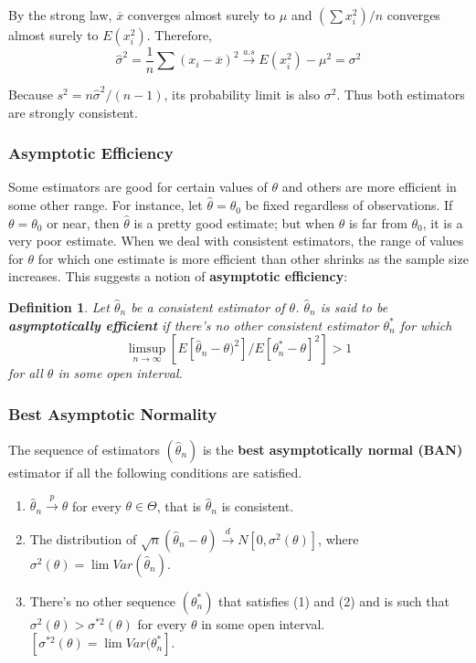 \documentclass{article}
\newtheorem{definition}{Definition}[section]
\begin{document}
By the strong law, \(\overline{x}\) converges almost surely to $\mu$ and \((\sum x_i^2)/n\) converges almost surely to \(E(x_i^2)\). Therefore,
\begin{equation*}
    \hat{\sigma}^2=\frac{1}{n} \sum(x_i-\overline{x})^2 \stackrel{a.s} \longrightarrow E(x_i^2)-\mu^2=\sigma^2
\end{equation*}

Because \(s^2=n\hat{\sigma}^2/(n-1)\), its probability limit is also \(\sigma^2\). Thus both estimators are strongly consistent.

\subsubsection{Asymptotic Efficiency}

Some estimators are good for certain values of \(\theta\) and others are more efficient in some other range. For instance, let \(\hat{\theta}=\theta_0\) be fixed regardless of observations. If \(\theta=\theta_0\) or near, then \(\hat{\theta}\) is a pretty good estimate; but when \(\theta\) is far from \(\theta_0\), it is a very poor estimate. When we deal with consistent estimators, the range of values for \(\theta\) for which one estimate is more efficient than other shrinks as the sample size increases. This suggests a notion of \textbf{asymptotic efficiency}:

\begin{definition}
    Let \(\hat{\theta}_n\) be a consistent estimator of \(\theta\). \(\hat{\theta}_n\) is said to be \textbf{asymptotically efficient} if there's no other consistent estimator \(\theta_n^*\) for which 
    \begin{equation*}
    \limsup_{n \rightarrow \infty} {[E[\hat{\theta}_n-\theta)^2]/E[\theta_n^*-\theta]^2]}>1 \end{equation*} for all \(\theta\) in some open interval.
\end{definition}

\subsubsection{Best Asymptotic Normality}

The sequence of estimators \((\hat{\theta}_n)\) is the \textbf{best asymptotically normal (BAN)} estimator if all the following conditions are satisfied.
\begin{enumerate}
    \item \(\hat{\theta}_n \stackrel{p} \longrightarrow \theta\) for every \(\theta \in \Theta\), that is \(\hat{\theta}_n\) is consistent.
    \item The distribution of \(\sqrt{n}(\hat{\theta}_n-\theta) \stackrel{d} \longrightarrow N[0,\sigma^2(\theta)]\), where \(\sigma^2(\theta)= \lim Var(\hat{\theta}_n)\).
    \item There's no other sequence \((\theta_n^*)\) that satisfies (1) and (2) and is such that \(\sigma^2(\theta)>\sigma^{*2}(\theta)\) for every \(\theta\) in some open interval. \([\sigma^{*2}(\theta)=\lim Var(\theta_n^{*}]\).
\end{enumerate}
\end{document}
